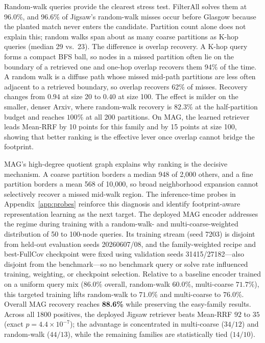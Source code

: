 \documentclass{article}
\begin{document}
Random-walk queries provide the clearest stress test. FilterAll solves them at 96.0\%, and 96.6\% of Jigsaw's random-walk misses occur before Glasgow because the planted match never enters the candidate. Partition count alone does not explain this; random walks span about as many coarse partitions as K-hop queries (median 29 vs.\ 23). The difference is overlap recovery. A K-hop query forms a compact BFS ball, so nodes in a missed partition often lie on the boundary of a retrieved one and one-hop overlap recovers them 94\% of the time. A random walk is a diffuse path whose missed mid-path partitions are less often adjacent to a retrieved boundary, so overlap recovers 62\% of misses. Recovery changes from $0.94$ at size 20 to $0.40$ at size 100. The effect is milder on the smaller, denser Arxiv, where random-walk recovery is $82.3\%$ at the half-partition budget and reaches $100\%$ at all 200 partitions. On MAG, the learned retriever leads Mean-RRF by 10 points for this family and by 15 points at size 100, showing that better ranking is the effective lever once overlap cannot bridge the footprint.

MAG's high-degree quotient graph explains why ranking is the decisive mechanism. A coarse partition borders a median 948 of 2{,}000 others, and a fine partition borders a mean 568 of 10{,}000, so broad neighborhood expansion cannot selectively recover a missed mid-walk region. The inference-time probes in Appendix~\ref{app:probes} reinforce this diagnosis and identify footprint-aware representation learning as the next target. The deployed MAG encoder addresses the regime during training with a random-walk- and multi-coarse-weighted distribution of 50 to 100-node queries. Its training stream (seed 7203) is disjoint from held-out evaluation seeds 20260607/08, and the family-weighted recipe and best-FullCov checkpoint were fixed using validation seeds 31415/27182---also disjoint from the benchmark---so no benchmark query or solve rate influenced training, weighting, or checkpoint selection. Relative to a baseline encoder trained on a uniform query mix ($86.0\%$ overall, random-walk $60.0\%$, multi-coarse $71.7\%$), this targeted training lifts random-walk to $71.0\%$ and multi-coarse to $76.0\%$. Overall MAG recovery reaches \textbf{88.6\%} while preserving the easy-family results. Across all 1800 positives, the deployed Jigsaw retriever beats Mean-RRF $92$ to $35$ (exact $p{=}4.4{\times}10^{-7}$); the advantage is concentrated in multi-coarse ($34/12$) and random-walk ($44/13$), while the remaining families are statistically tied ($14/10$).
\end{document}
